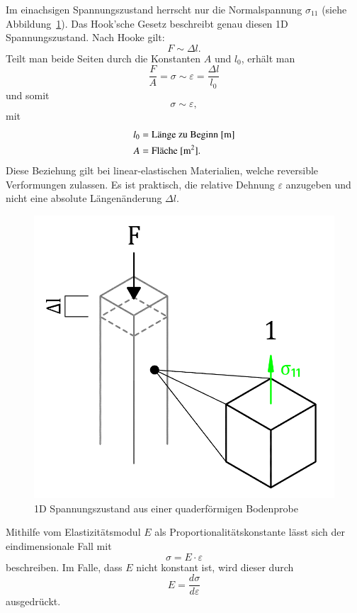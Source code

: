 Im einachsigen Spannungszustand herrscht nur die Normalspannung $\sigma_{11}$ (siehe Abbildung~\ref{fig:Bild1}).
Das Hook'sche Gesetz beschreibt genau diesen 1D Spannungszustand.
Nach Hooke gilt:
\[
F
\sim
\Delta l
.
\]
Teilt man beide Seiten durch die Konstanten $A$ und $l_0$, erhält man
\[
\frac{F}{A}
=
\sigma
\sim
\varepsilon
=
\frac{\Delta l}{l_0}
\]
und somit
\[
\sigma
\sim
\varepsilon
,
\]
mit
\begin{align*}
	l_0 &= \text{Länge zu Beginn [\si{\meter}]} \\
	  A &= \text{Fläche [\si{\meter\squared}].}
\end{align*}
Diese Beziehung gilt bei linear-elastischen Materialien, welche reversible Verformungen zulassen.
Es ist praktisch, die relative Dehnung $\varepsilon$ anzugeben und nicht eine absolute Längenänderung $\Delta l$.
%
%
%
\begin{figure}
	\centering
	\includegraphics[width=0.35\linewidth,keepaspectratio]{papers/spannung/Grafiken/Bild1.png}
	\caption{1D Spannungszustand aus einer quaderförmigen Bodenprobe}
	\label{fig:Bild1}
\end{figure}
Mithilfe vom Elastizitätsmodul $E$ als Proportionalitätskonstante lässt sich der eindimensionale Fall mit
\[
\sigma
=
E\cdot\varepsilon
\]
beschreiben.
Im Falle, dass $E$ nicht konstant ist, wird dieser durch
\[
E
=
\frac{d\sigma}{d\varepsilon}
\]
ausgedrückt.
